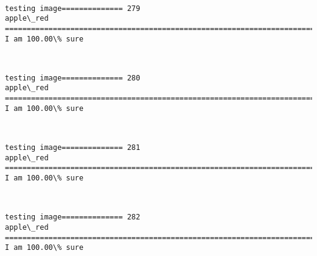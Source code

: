 \documentclass[11pt]{article}
\begin{document}
    \begin{center}
    \end{center}
    { \hspace*{\fill} \\}
    
    \begin{Verbatim}[commandchars=\\\{\}]
testing image============== 279
apple\_red
============================================================================
I am 100.00\% sure

    \end{Verbatim}

    \begin{center}
    \end{center}
    { \hspace*{\fill} \\}
    
    \begin{Verbatim}[commandchars=\\\{\}]
testing image============== 280
apple\_red
============================================================================
I am 100.00\% sure

    \end{Verbatim}

    \begin{center}
    \end{center}
    { \hspace*{\fill} \\}
    
    \begin{Verbatim}[commandchars=\\\{\}]
testing image============== 281
apple\_red
============================================================================
I am 100.00\% sure

    \end{Verbatim}

    \begin{center}
    \end{center}
    { \hspace*{\fill} \\}
    
    \begin{Verbatim}[commandchars=\\\{\}]
testing image============== 282
apple\_red
============================================================================
I am 100.00\% sure

    \end{Verbatim}
\end{document}
